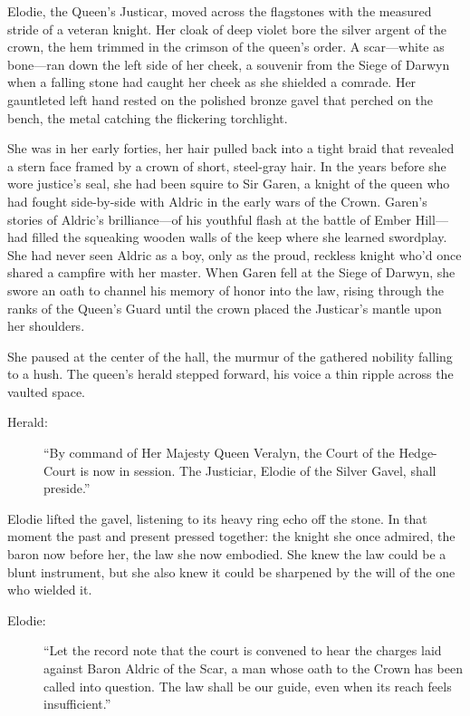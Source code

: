 \documentclass[11pt,twoside]{book}
\begin{document}
Elodie, the Queen's Justicar, moved across the flagstones with the measured stride of a veteran knight.  Her cloak of deep violet bore the silver argent of the crown, the hem trimmed in the crimson of the queen's order.  A scar---white as bone---ran down the left side of her cheek, a souvenir from the Siege of Darwyn when a falling stone had caught her cheek as she shielded a comrade.  Her gauntleted left hand rested on the polished bronze gavel that perched on the bench, the metal catching the flickering torchlight.  

She was in her early forties, her hair pulled back into a tight braid that revealed a stern face framed by a crown of short, steel-gray hair.  In the years before she wore justice's seal, she had been squire to Sir Garen, a knight of the queen who had fought side-by-side with Aldric in the early wars of the Crown.  Garen's stories of Aldric's brilliance---of his youthful flash at the battle of Ember Hill---had filled the squeaking wooden walls of the keep where she learned swordplay.  She had never seen Aldric as a boy, only as the proud, reckless knight who'd once shared a campfire with her master.  When Garen fell at the Siege of Darwyn, she swore an oath to channel his memory of honor into the law, rising through the ranks of the Queen's Guard until the crown placed the Justicar's mantle upon her shoulders.

She paused at the center of the hall, the murmur of the gathered nobility falling to a hush.  The queen's herald stepped forward, his voice a thin ripple across the vaulted space.

\begin{description}
\item[Herald:] ``By command of Her Majesty Queen Veralyn, the Court of the Hedge-Court is now in session. The Justiciar, Elodie of the Silver Gavel, shall preside.''
\end{description}

Elodie lifted the gavel, listening to its heavy ring echo off the stone.  In that moment the past and present pressed together: the knight she once admired, the baron now before her, the law she now embodied.  She knew the law could be a blunt instrument, but she also knew it could be sharpened by the will of the one who wielded it.

\begin{description}
\item[Elodie:] ``Let the record note that the court is convened to hear the charges laid against Baron Aldric of the Scar, a man whose oath to the Crown has been called into question. The law shall be our guide, even when its reach feels insufficient.''
\end{description}
\end{document}
